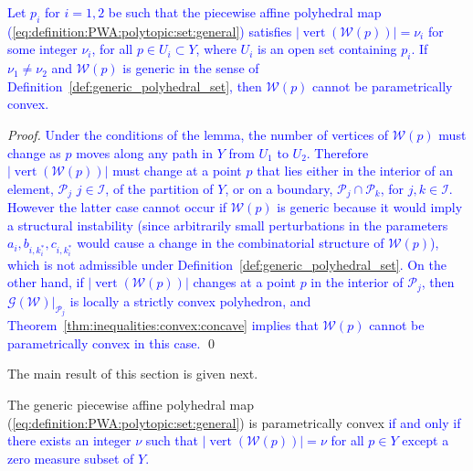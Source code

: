 \documentclass[smallextended]{svjour3}       %
\numberwithin{equation}{section}
\DeclareMathOperator{\vertices}{vert}
\newcommand{\revision}[1]{\textcolor{blue}{#1}}
\begin{document}
\begin{lemma}\label{lem:vert_change}
\revision{Let $p_i$ for $i=1,2$ be such that the piecewise affine polyhedral map (\ref{eq:definition:PWA:polytopic:set:general}) satisfies $\lvert \vertices(\mathcal W(p)) \rvert = \nu_i$ for some integer $\nu_i$,
for all $p\in U_i\subset Y$, where $U_i$ is an open set containing $p_i$. 
If $\nu_1\neq \nu_2$ and $\mathcal W(p)$ is generic in the sense of Definition~\ref{def:generic_polyhedral_set}, then $\mathcal W(p)$ cannot be parametrically convex.}
\end{lemma}

\begin{proof}
\revision{%
Under the conditions of the lemma, the number of vertices of $\mathcal W(p)$ must change as $p$ moves along any path in $Y$ from $U_1$ to $U_2$. Therefore $\lvert \vertices (\mathcal W(p)) \rvert$ must change at a point $p$ that lies either in the interior of an element, $\mathcal P_j$ $j\in\mathcal I$, of the partition of $Y$, or on a boundary, $\mathcal P_j\cap\mathcal P_k$, for $j,k\in\mathcal I$. 
%
However the latter case cannot occur if $\mathcal W(p)$ is generic because it would imply a structural instability (since arbitrarily small perturbations in the parameters $a_i,b_{i,k_i^\ast},c_{i,k_i^\ast}$ would cause a change in the combinatorial structure of $\mathcal W(p)$), which is not admissible under Definition~\ref{def:generic_polyhedral_set}.
%
On the other hand, if $\lvert \vertices (\mathcal W(p)) \rvert$ changes at a point $p$ in the interior of $\mathcal P_j$, then $\mathscr G(\mathcal W)\vert_{\mathcal P_j}$ is locally a strictly convex polyhedron, and Theorem~\ref{thm:inequalities:convex:concave} implies that $\mathcal W(p)$ cannot be parametrically convex in this case.} \qed
\end{proof}


The main result of this section is given next.

\begin{theorem}\label{thm:p:convexity:PWA:set:constant:num:verts}
The generic piecewise affine polyhedral map (\ref{eq:definition:PWA:polytopic:set:general})
is parametrically convex \revision{if and only if there exists an integer $\nu$ such that 
$\lvert\vertices(\mathcal W(p))\rvert = \nu$
for all $p\in Y$ except a zero measure subset of $Y$.}
\end{theorem}
%
\end{document}
